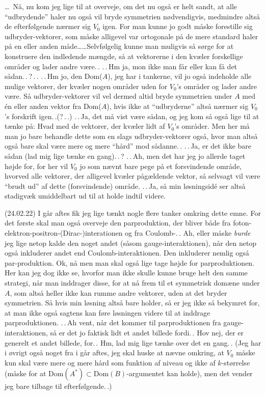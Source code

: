 \documentclass{report}
\begin{document}
\ldots\ Nå, nu kom jeg lige til at overveje, om det nu også er helt sandt, at alle ``udbrydende'' haler nu også vil bryde symmetrien nødvendigvis, medmindre altså de efterfølgende nærmer sig $V_0$ igen. For man kunne jo godt måske forestille sig udbryder-vektorer, som måske alligevel var ortogonale på de mere standard haler på en eller anden måde\ldots \ldots Selvfølgelig kunne man muligvis så sørge for at konstruere den indledende mængde, så at vektorerne i den kvæler forskellige områder og lader andre være.\,. .\,.\,Hm ja, mon ikke man får eller kan få det sådan.\,.\,?\,.\,. .\,.\,Hm jo, den Dom($A$), jeg har i tankerne, vil jo også indeholde alle mulige vektorer, der kvæler nogen områder uden for $V_0$'s områder og lader andre være. Så udbryder-vektorer vil vel dermed altid bryde symmetrien under $A$ med én eller anden vektor fra Dom($A$), hvis ikke at ``udbryderne'' altså nærmer sig $V_0$'s forskrift igen.\,.(?\,.\,.) .\,.\,Ja, det må vist være sådan, og jeg kom så også lige til at tænke på: Hvad med de vektorer, der kvæler lidt af $V_0$'s områder. Men her må man jo bare behandle dette som en slags udbryder-vektorer også, hvor man altså også bare skal være mere og mere ``hård'' mod sådanne.\,. .\,.\,Ja, er det ikke bare sådan (lad mig lige tænke en gang).\,.\,? .\,.\,Ah, men det har jeg jo allerde taget højde for, for her vil $V_0$ jo som nævnt bare pege på et forsvindende område, hvorved alle vektorer, der alligevel kvæler pågældende vektor, så selvsagt vil være ``brudt ud'' af dette (forsvindende) område. .\,.\,Ja, så min løsningsidé ser altså stadigvæk umiddelbart ud til at holde indtil videre. 


(24.02.22) I går aftes fik jeg lige tænkt nogle flere tanker omkring dette emne. For det første skal man også overveje den parproduktion, der bliver både fra foton-elektron-positron-(Dirac-)interationen og fra Coulomb-.\,. Ah, eller måske \emph{burde} jeg lige netop kalde den noget andet (såsom gauge-interaktionen), når den netop også inkluderer andet end Coulomb-interaktionen. Den inkluderer nemlig også par-produktion. Ok, nå men man skal også lige tage højde for parproduktionen. Her kan jeg dog ikke se, hvorfor man ikke skulle kunne bruge helt den samme strategi, når man inddrager disse, for at nå frem til et symmetrisk domæne under $A$, som altså heller ikke kan rumme andre vektorer, uden at det bryder symmetrien. Så hvis min løsning altså bare holder, så er jeg ikke så bekymret for, at man ikke også sagtens kan føre løsningen videre til at inddrage parproduktionen. .\,.\,Ah vent, når det kommer til parproduktionen fra gauge-interaktionen, så er det jo faktisk lidt et andet billede fordi.\,. Hov nej, der er generelt et andet billede, for.\,. Hm, lad mig lige tænke over det en gang.\,. (Jeg har i øvrigt også noget fra i går aftes, jeg skal huske at nævne omkring, at $V_0$ måske kun skal være mere og mere hård som funktion af niveau og ikke af $k$-størrelse (måske for at Dom$(A^*)\subset\mathrm{Dom}(B)$-argumentet kan holde), men det vender jeg bare tilbage til efterfølgende.\,.) 
\end{document}
